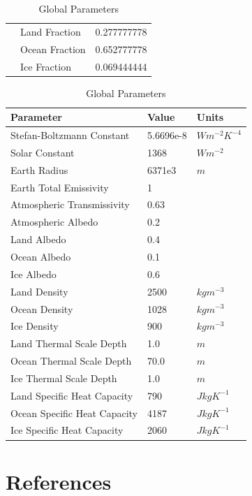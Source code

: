 \documentclass{article}
\begin{document}
\begin{table}[H]
{\begin{tabular}{lll}
     & Land Fraction & 0.277777778 \\
     & Ocean Fraction & 0.652777778 \\ 
     & Ice Fraction & 0.069444444\\
    \end{tabular}
    \label{tab:zoneparams}
    }
    \hfill
    \parbox{.45\linewidth}{
    \captionsetup{singlelinecheck = false, justification=justified}
    \caption{Global Parameters}
    \begin{tabular}{lll}
    \hline
    Parameter & Value & Units \\
    \hline
    Stefan-Boltzmann Constant & 5.6696e-8 & $Wm^{-2}K^{-4}$ \\
    Solar Constant & 1368 & $Wm^{-2}$ \\
    Earth Radius & 6371e3 & $m$ \\
    Earth Total Emissivity & 1  \\
    Atmospheric Transmissivity & 0.63  \\
    Atmospheric Albedo & 0.2 \\
    Land Albedo & 0.4 \\
    Ocean Albedo & 0.1\\
    Ice Albedo & 0.6 \\
    Land Density & 2500 & $kgm^{-3}$\\
    Ocean Density & 1028 & $kgm^{-3}$\\
    Ice Density & 900 & $kgm^{-3}$\\
    Land Thermal Scale Depth & 1.0 & $m$ \\
    Ocean Thermal Scale Depth & 70.0 & $m$ \\
    Ice Thermal Scale Depth & 1.0 & $m$ \\
    Land Specific Heat Capacity & 790 & $JkgK^{-1}$\\
    Ocean Specific Heat Capacity & 4187 & $JkgK^{-1}$\\
    Ice Specific Heat Capacity & 2060 & $JkgK^{-1}$\\
    \end{tabular}
    \label{tab:globalparams}}
\end{table}
\FloatBarrier

\newpage
\section{References}
\printbibliography
\end{document}
